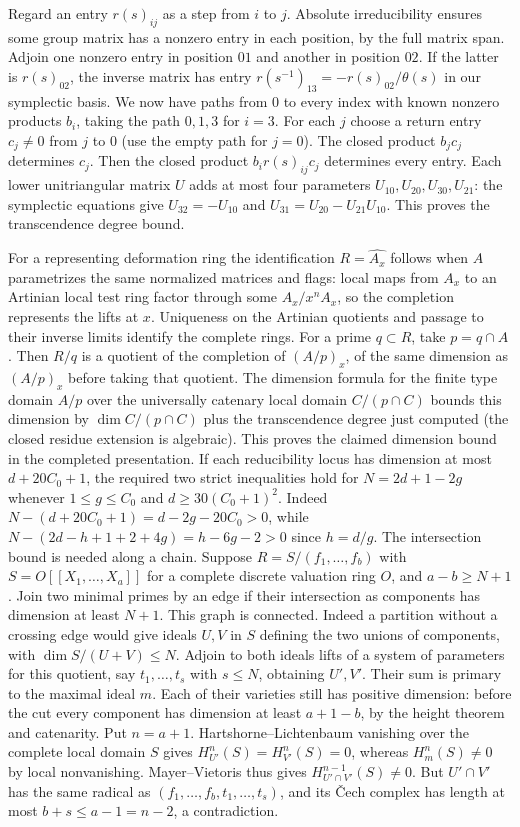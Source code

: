 \documentclass[11pt]{amsart}
\theoremstyle{definition}
\theoremstyle{remark}
\begin{document}
Regard an entry $r(s)_{ij}$ as a step from $i$ to $j$.
Absolute irreducibility ensures some group matrix has a nonzero
entry in each position, by the full matrix span. Adjoin one
nonzero entry in position $01$ and another in position $02$.
If the latter is $r(s)_{02}$, the inverse matrix has entry
$r(s^{-1})_{13}=-r(s)_{02}/\theta(s)$ in our symplectic basis.
We now have paths from $0$ to every index with known nonzero
products $b_i$, taking the path $0,1,3$ for $i=3$.
For each $j$ choose a return entry $c_j\ne0$ from $j$ to $0$
(use the empty path for $j=0$). The closed product $b_jc_j$
determines $c_j$. Then the closed product $b_i r(s)_{ij}c_j$
determines every entry. Each lower unitriangular matrix $U$
adds at most four parameters $U_{10},U_{20},U_{30},U_{21}$:
the symplectic equations give $U_{32}=-U_{10}$ and
$U_{31}=U_{20}-U_{21}U_{10}$. This proves the transcendence
degree bound.

For a representing deformation ring the identification
$R=\widehat{A_x}$ follows when $A$ parametrizes the same normalized
matrices and flags: local maps from $A_x$ to an Artinian local test
ring factor through some $A_x/x^n A_x$, so the completion represents
the lifts at $x$. Uniqueness on the Artinian quotients and passage
to their inverse limits identify the complete rings. For a prime
$q\subset R$, take $p=q\cap A$. Then $R/q$ is a quotient of the
completion of $(A/p)_x$, of the same dimension as $(A/p)_x$
before taking that quotient. The dimension formula for the finite
type domain $A/p$ over the universally catenary local domain
$C/(p\cap C)$ bounds this dimension by $\dim C/(p\cap C)$ plus
the transcendence degree just computed (the closed residue extension
is algebraic). This proves the claimed dimension bound in the
completed presentation. If each reducibility locus has dimension
at most $d+20C_0+1$, the
required two strict inequalities hold for $N=2d+1-2g$ whenever
$1\le g\le C_0$ and $d\ge30(C_0+1)^2$. Indeed
$N-(d+20C_0+1)=d-2g-20C_0>0$, while
$N-(2d-h+1+2+4g)=h-6g-2>0$ since $h=d/g$.
The intersection bound is needed along a chain. Suppose
$R=S/(f_1,\ldots,f_b)$ with $S=O[[X_1,\ldots,X_a]]$ for a
complete discrete valuation ring $O$, and $a-b\ge N+1$. Join two
minimal primes by an edge if their intersection as components has
dimension at least $N+1$. This graph is connected. Indeed a
partition without a crossing edge would give ideals $U,V$ in $S$
defining the two unions of components, with $\dim S/(U+V)\le N$.
Adjoin to both ideals lifts of a system of parameters for this
quotient, say $t_1,\ldots,t_s$ with $s\le N$, obtaining $U',V'$.
Their sum is primary to the maximal ideal $m$. Each of their
varieties still has positive dimension: before the cut every
component has dimension at least $a+1-b$, by the height theorem
and catenarity. Put $n=a+1$. Hartshorne--Lichtenbaum vanishing
over the complete local domain $S$ gives
$H^n_{U'}(S)=H^n_{V'}(S)=0$, whereas $H^n_m(S)\ne0$ by local
nonvanishing. Mayer--Vietoris thus gives
$H^{n-1}_{U'\cap V'}(S)\ne0$. But $U'\cap V'$ has the same radical
as $(f_1,\ldots,f_b,t_1,\ldots,t_s)$, and its \v Cech complex
has length at most $b+s\le a-1=n-2$, a contradiction.
\end{document}

